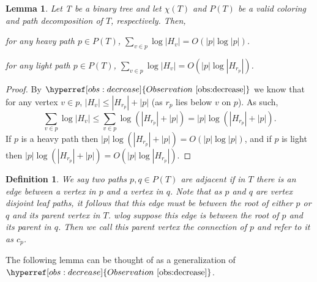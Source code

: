 \documentclass[11pt]{article}
\newtheorem{lemma}[theorem]{Lemma}
\newtheorem{definition}[theorem]{Definition}
\theoremstyle{definition}
\newcommand{\Obs}[1]{\hyperref[obs:#1]{Observation~\ref*{obs:#1}}} %
\begin{document}
\begin{lemma}
\label{lem:pathBounds}
 Let T be a binary tree and let $\chi(T)$ and $P(T)$ be a valid coloring and path decomposition of $T$, respectively.
 Then, 
 \begin{compactenum}
  \item for any heavy path $p\in P(T)$, $\sum_{v\in p} \log |H_v| = O(|p| \log |p|)$.
  \item for any light path $p\in P(T)$, $\sum_{v\in p} \log |H_v| = O(|p| \log |H_{r_p}|)$.
 \end{compactenum}
\end{lemma}
\begin{proof}
 By $\Obs{decrease}$ we know that for any vertex $v\in p$, $|H_v|\leq |H_{r_p}| + |p|$ (as $r_p$ lies below $v$ on $p$).
 As such, 
 \[
 \sum_{v\in p} \log |H_v| \leq \sum_{v\in p} \log(|H_{r_p}| + |p|)  = |p| \log (|H_{r_p}| + |p|).
 \]
 If $p$ is a heavy path then $|p| \log (|H_{r_p}| + |p|) = O(|p| \log |p|)$, and if $p$ is light then 
 $|p| \log (|H_{r_p}| + |p|) = O(|p| \log |H_{r_p}| )$.
\end{proof}

\begin{definition}
 We say two paths $p,q \in P(T)$ are adjacent if in $T$ there is an edge between a vertex in $p$ and a vertex in $q$.  
Note that as $p$ and $q$ are vertex disjoint leaf paths, it follows that this edge must be between the root of either 
$p$ or $q$ and its parent vertex in $T$.  wlog suppose this edge is between the root of $p$ and its parent in $q$. 
Then we call this parent vertex the \emph{connection} of $p$ and refer to it as $c_p$.
\end{definition}

The following lemma can be thought of as a generalization of $\Obs{decrease}$.
\end{document}
